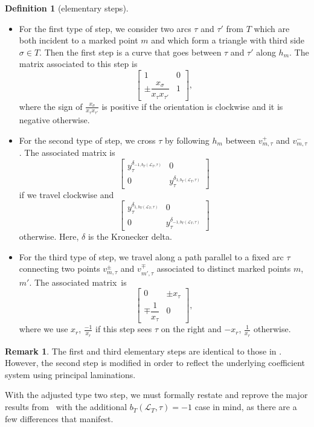 \documentclass[10pt,a4paper]{amsart}
\numberwithin{equation}{section}
\theoremstyle{definition}
\newtheorem{Definition}[Theorem]{Definition}
\newtheorem{Remark}[Theorem]{Remark}
\begin{document}
\begin{Definition}[elementary steps]\label{definition:elementarysteps} \quad
\begin{itemize}\itemsep=0pt
\item For the first type of step, we consider two arcs $\tau$ and $\tau'$ from $T$ which are both incident to a marked point $m$ and which form a triangle with third side $\sigma\in T$. Then the first step is a curve that goes between $\tau$ and $\tau'$ along $h_m$. The matrix associated to this step is
\[
\left[\begin{matrix}
1 & 0\\
\pm\dfrac{x_{\sigma}}{x_{\tau}x_{\tau'}} & 1
\end{matrix}\right],
\]
where the sign of $\frac{x_{\sigma}}{x_{\tau}x_{\tau'}}$ is positive if the orientation is clockwise and it is negative otherwise.

\item For the second type of step, we cross $\tau$ by following $h_m$ between $v^{+}_{m, \tau}$ and $v^{-}_{m, \tau}$. The associated matrix is
\[
\begin{bmatrix}
y_{\tau}^{\delta_{-1, b_T(\mathcal{L}_T, \tau)}} & 0\\
0 & y_{\tau}^{\delta_{1, b_T(\mathcal{L}_T, \tau)}}
\end{bmatrix}
\] if we travel clockwise and{\samepage
\[
\begin{bmatrix}
y_{\tau}^{\delta_{1, b_T(\mathcal{L}_T, \tau)}} & 0\\
0 & y_{\tau}^{\delta_{-1, b_T(\mathcal{L}_T, \tau)}}
\end{bmatrix}
\] otherwise. Here, $\delta$ is the Kronecker delta.}

\item For the third type of step, we travel along a path parallel to a fixed arc $\tau$ connecting two points $v^{\pm}_{m, \tau}$ and $v^{\mp}_{m', \tau}$ associated to distinct marked points $m$, $m'$. The associated matrix~is
\[\begin{bmatrix}
0 & \pm x_{\tau}\\
\mp \dfrac{1}{x_{\tau}} & 0
\end{bmatrix},\] where we use $x_r$, $\frac{-1}{x_r}$ if this step sees $\tau$ on the right and $-x_r$, $\frac{1}{x_r}$ otherwise.
\end{itemize}

\begin{Remark}
The first and third elementary steps are identical to those in \cite{MW13}. However, the second step is modified in order to reflect the underlying coefficient system using principal laminations.
\end{Remark}

With the adjusted type two step, we must formally restate and reprove the major results from~\cite[Section 5]{MW13} with the additional $b_T(\mathcal{L}_T, \tau)=-1$ case in mind, as there are a few differences that manifest.

\end{Definition}
\end{document}
